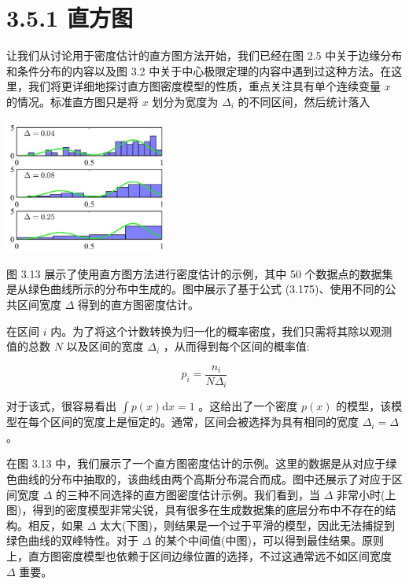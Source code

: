 \documentclass[10pt]{article}
\begin{document}
\section*{3.5.1 直方图}

让我们从讨论用于密度估计的直方图方法开始，我们已经在图 2.5 中关于边缘分布和条件分布的内容以及图 3.2 中关于中心极限定理的内容中遇到过这种方法。在这里，我们将更详细地探讨直方图密度模型的性质，重点关注具有单个连续变量 \(x\) 的情况。标准直方图只是将 \(x\) 划分为宽度为 \({\Delta }_{i}\) 的不同区间，然后统计落入

\begin{center}
\includegraphics[max width=0.4\textwidth]{images/0194e279-9b28-703a-88f4-c3ac21e2010d_118_942_368_548_453_0.jpg}
\end{center}
\hspace*{3em} 

图 3.13 展示了使用直方图方法进行密度估计的示例，其中 50 个数据点的数据集是从绿色曲线所示的分布中生成的。图中展示了基于公式 (3.175)、使用不同的公共区间宽度 \(\Delta\) 得到的直方图密度估计。

在区间 \(i\) 内。为了将这个计数转换为归一化的概率密度，我们只需将其除以观测值的总数 \(N\) 以及区间的宽度 \({\Delta }_{i}\) ，从而得到每个区间的概率值:

\[
{p}_{i} = \frac{{n}_{i}}{N{\Delta }_{i}} \tag{3.175}
\]

对于该式，很容易看出 \(\int p\left( x\right) \mathrm{d}x = 1\) 。这给出了一个密度 \(p\left( x\right)\) 的模型，该模型在每个区间的宽度上是恒定的。通常，区间会被选择为具有相同的宽度 \({\Delta }_{i} = \Delta\) 。

在图 3.13 中，我们展示了一个直方图密度估计的示例。这里的数据是从对应于绿色曲线的分布中抽取的，该曲线由两个高斯分布混合而成。图中还展示了对应于区间宽度 \(\Delta\) 的三种不同选择的直方图密度估计示例。我们看到，当 \(\Delta\) 非常小时(上图)，得到的密度模型非常尖锐，具有很多在生成数据集的底层分布中不存在的结构。相反，如果 \(\Delta\) 太大(下图)，则结果是一个过于平滑的模型，因此无法捕捉到绿色曲线的双峰特性。对于 \(\Delta\) 的某个中间值(中图)，可以得到最佳结果。原则上，直方图密度模型也依赖于区间边缘位置的选择，不过这通常远不如区间宽度 \(\Delta\) 重要。
\end{document}
